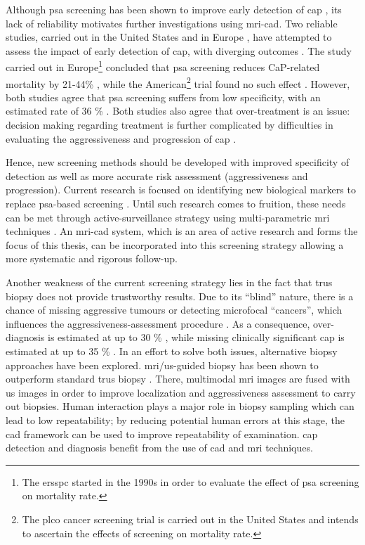 Although \ac{psa} screening has been shown to improve early detection of \ac{cap} \cite{Chou2011}, its lack of reliability motivates further investigations using \ac{mri}-\ac{cad}.
Two reliable studies, carried out in the United States \cite{Andriole2009} and in Europe \cite{Schroeder2012, Hugosson2010}, have attempted to assess the impact of early detection of \ac{cap}, with diverging outcomes \cite{Chou2011,Heidenreich2013}.
The study carried out in Europe\footnote{The \ac{ersspc} started in the 1990s in order to evaluate the effect of \ac{psa} screening on mortality rate.} concluded that \ac{psa} screening reduces CaP-related mortality by 21-44\% \cite{Schroeder2012, Hugosson2010}, while the American\footnote{The \ac{plco} cancer screening trial is carried out in the United States and intends to ascertain the effects of screening on mortality rate.} trial found no such effect \cite{Andriole2009}.
However, both studies agree that \ac{psa} screening suffers from low specificity, with an estimated rate of 36 \% \cite{Schroder2008}.
Both studies also agree that over-treatment is an issue: decision making regarding treatment is further complicated by difficulties in evaluating the aggressiveness and progression of \ac{cap} \cite{Delpierre2013}. 

Hence, new screening methods should be developed with improved specificity of detection as well as more accurate risk assessment (aggressiveness and progression).
Current research is focused on identifying new biological markers to replace \ac{psa}-based screening \cite{Bourdoumis2010,Morgan2011,Brenner2013}.
Until such research comes to fruition, these needs can be met through active-surveillance strategy using multi-parametric \ac{mri} techniques \cite{Hoeks2011,Moore2013}.
An \ac{mri}-\acs{cad} system, which is an area of active research and forms the focus of this thesis, can be incorporated into this screening strategy allowing a more systematic and rigorous follow-up.

Another weakness of the current screening strategy lies in the fact that \ac{trus} biopsy does not provide trustworthy results.
Due to its ``blind'' nature, there is a chance of missing aggressive tumours or detecting microfocal ``cancers'', which influences the aggressiveness-assessment procedure \cite{Noguchi2001}.
As a consequence, over-diagnosis is estimated at up to 30 \% \cite{Haas2007}, while missing clinically significant \ac{cap} is estimated at up to 35 \% \cite{Taira2010}.
In an effort to solve both issues, alternative biopsy approaches have been explored.
\ac{mri}/\ac{us}-guided biopsy has been shown to outperform standard \ac{trus} biopsy \cite{Delongchamps2013}.
There, multimodal \ac{mri} images are fused with \ac{us} images in order to improve localization and aggressiveness assessment to carry out biopsies.
Human interaction plays a major role in biopsy sampling which can lead to low repeatability; by reducing potential human errors at this stage, the \acs{cad} framework can be used to improve repeatability of examination.
\ac{cap} detection and diagnosis benefit from the use of \acs{cad} and \ac{mri} techniques.

